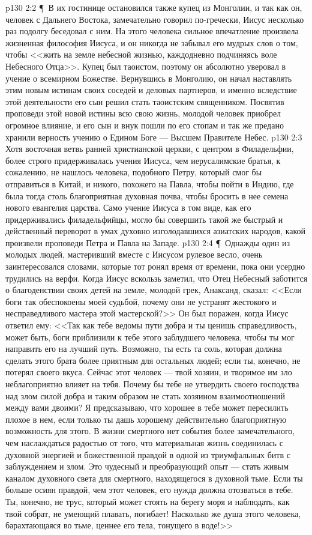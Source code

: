 \vs p130 2:2 \P\ В их гостинице остановился также купец из Монголии, и так как он, человек с Дальнего Востока, замечательно говорил по\hyp{}гречески, Иисус несколько раз подолгу беседовал с ним. На этого человека сильное впечатление произвела жизненная философия Иисуса, и он никогда не забывал его мудрых слов о том, чтобы <<жить на земле небесной жизнью, каждодневно подчиняясь воле Небесного Отца>>. Купец был таоистом, поэтому он абсолютно уверовал в учение о всемирном Божестве. Вернувшись в Монголию, он начал наставлять этим новым истинам своих соседей и деловых партнеров, и именно вследствие этой деятельности его сын решил стать таоистским священником. Посвятив проповеди этой новой истины всю свою жизнь, молодой человек приобрел огромное влияние, и его сын и внук пошли по его стопам и так же предано хранили верность учению о Едином Боге --- Высшем Правителе Небес.
\vs p130 2:3 Хотя восточная ветвь ранней христианской церкви, с центром в Филадельфии, более строго придерживалась учения Иисуса, чем иерусалимские братья, к сожалению, не нашлось человека, подобного Петру, который смог бы отправиться в Китай, и никого, похожего на Павла, чтобы пойти в Индию, где была тогда столь благоприятная духовная почва, чтобы бросить в нее семена нового евангелия царства. Само учение Иисуса в том виде, как его придерживались филадельфийцы, могло бы совершить такой же быстрый и действенный переворот в умах духовно изголодавшихся азиатских народов, какой произвели проповеди Петра и Павла на Западе.
\vs p130 2:4 \P\ Однажды один из молодых людей, мастеривший вместе с Иисусом рулевое весло, очень заинтересовался словами, которые тот ронял время от времени, пока они усердно трудились на верфи. Когда Иисус вскользь заметил, что Отец Небесный заботится о благоденствии своих детей на земле, молодой грек, Анаксанд, сказал: <<Если боги так обеспокоены моей судьбой, почему они не устранят жестокого и несправедливого мастера этой мастерской?>> Он был поражен, когда Иисус ответил ему: <<Так как тебе ведомы пути добра и ты ценишь справедливость, может быть, боги приблизили к тебе этого заблудшего человека, чтобы ты мог направить его на лучший путь. Возможно, ты есть та соль, которая должна сделать этого брата более приятным для остальных людей; если ты, конечно, не потерял своего вкуса. Сейчас этот человек --- твой хозяин, и творимое им зло неблагоприятно влияет на тебя. Почему бы тебе не утвердить своего господства над злом силой добра и таким образом не стать хозяином взаимоотношений между вами двоими? Я предсказываю, что хорошее в тебе может пересилить плохое в нем, если только ты дашь хорошему действительно благоприятную возможность для этого. В жизни смертного нет события более замечательного, чем наслаждаться радостью от того, что материальная жизнь соединилась с духовной энергией и божественной правдой в одной из триумфальных битв с заблуждением и злом. Это чудесный и преобразующий опыт --- стать живым каналом духовного света для смертного, находящегося в духовной тьме. Если ты больше осиян правдой, чем этот человек, его нужда должна отозваться в тебе. Ты, конечно, не трус, который может стоять на берегу моря и наблюдать, как твой собрат, не умеющий плавать, погибает! Насколько же душа этого человека, барахтающаяся во тьме, ценнее его тела, тонущего в воде!>>
